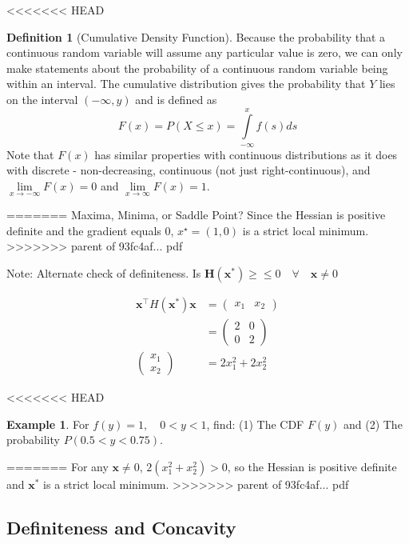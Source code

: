 \documentclass[]{book}
\theoremstyle{definition}
\newtheorem{definition}{Definition}[chapter]
\theoremstyle{definition}
\newtheorem{example}{Example}[chapter]
\theoremstyle{definition}
\theoremstyle{remark}
\begin{document}
<<<<<<< HEAD
\begin{definition}[Cumulative Density Function]
\protect\hypertarget{def:unnamed-chunk-80}{}{\label{def:unnamed-chunk-80} {} }Because the probability that a continuous random variable will assume any particular value is zero, we can only make statements about the probability of a continuous random variable being within an interval. The cumulative distribution gives the probability that \(Y\) lies on the interval \((-\infty,y)\) and is defined as \[F(x)=P(X\le x)=\int\limits_{-\infty}^x f(s)ds\] Note that \(F(x)\) has similar properties with continuous distributions as it does with discrete - non-decreasing, continuous (not just right-continuous), and \(\lim\limits_{x \to -\infty} F(x) = 0\) and \(\lim\limits_{x \to \infty} F(x) = 1\).
\end{definition}
=======
Maxima, Minima, or Saddle Point? Since the Hessian is positive definite and the gradient equals 0, \(x^\star = (1,0)\) is a strict local minimum.
>>>>>>> parent of 93fc4af... pdf

Note: Alternate check of definiteness. Is \(\mathbf{H(x^*)} \geq \leq 0 \quad \forall \quad \mathbf{x}\ne 0\)

\begin{align*}
\mathbf{x}^\top H(\mathbf{x}^*) \mathbf{x} &= \begin{pmatrix} x_1 & x_2 \end{pmatrix}\\
&= \begin{pmatrix} 2&0\\0&2 \end{pmatrix}\\
\begin{pmatrix} x_1\\x_2\end{pmatrix} &= 2x_1^2+2x_2^2
\end{align*}

<<<<<<< HEAD
\begin{example}
\protect\hypertarget{exm:unnamed-chunk-81}{}{\label{exm:unnamed-chunk-81} }
For \(f(y)=1, \quad 0<y<1\), find: (1) The CDF \(F(y)\) and (2) The probability \(P(0.5<y<0.75)\).
\end{example}
=======
For any \(\mathbf{x}\ne 0\), \(2(x_1^2+x_2^2)>0\), so the Hessian is positive definite and \(\mathbf{x}^*\) is a strict local minimum.
>>>>>>> parent of 93fc4af... pdf

\hypertarget{definiteness-and-concavity}{%
\subsection*{Definiteness and Concavity}\label{definiteness-and-concavity}}
\end{document}
